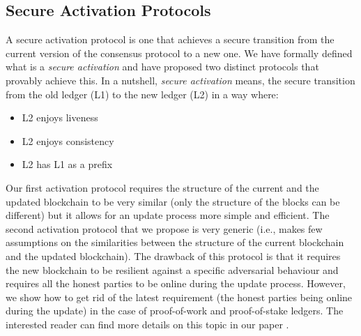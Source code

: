 \subsection{Secure Activation Protocols}\label{sec:secure_activation_protocols}
A secure activation protocol is one that achieves a secure transition from the 
current version of the consensus protocol to a new one. We have formally 
defined what is a \emph{secure activation} and have proposed two distinct 
protocols that provably achieve this. In a
nutshell, \emph{secure activation} means, the secure transition from the old
ledger (L1) to the new ledger (L2) in a way where:
\begin{itemize}
	\item L2 enjoys liveness \cite{backbone}
	\item L2 enjoys consistency \cite{backbone}
	\item L2 has L1 as a prefix
\end{itemize}

Our first activation protocol requires the structure of the current and the 
updated blockchain to be very similar (only the structure of the blocks can be 
different) but it allows for an update process more simple and efficient. The 
second activation protocol that we propose is very generic (i.e., makes few 
assumptions on the similarities between the structure of the current blockchain 
and the updated blockchain). The drawback of this protocol is that it requires 
the new blockchain to be resilient against a specific adversarial behaviour and
requires all the honest parties to be online during the update process.
However, we show how to get rid of the latest requirement (the honest
parties being online during the update) in the case of proof-of-work and
proof-of-stake ledgers. The interested reader can find more details on this 
topic in our paper \cite{secure_activation}.